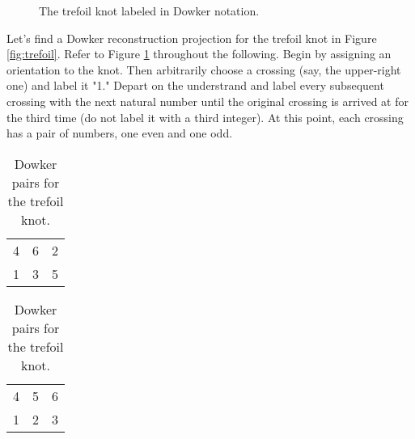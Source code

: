 \documentclass[titlepage]{article}
\begin{document}
\begin{figure}[h!]
    \centering
    \vspace{-2.3em}
    \caption{The trefoil knot labeled in Dowker notation.}
    \label{fig:trefoilDowker}
\end{figure}

Let's find a Dowker reconstruction projection for the trefoil knot in Figure \ref{fig:trefoil}. Refer to Figure \ref{fig:trefoilDowker} throughout the following. Begin by assigning an orientation to the knot. Then arbitrarily choose a crossing (say, the upper-right one) and label it "1." Depart on the understrand and label every subsequent crossing with the next natural number until the original crossing is arrived at for the third time (do not label it with a third integer). At this point, each crossing has a pair of numbers, one even and one odd.\par

\begin{table}[h!]
    \centering
    \begin{subtable}[b]{0.3\linewidth}
        \centering
        \begin{tabular}{ccc}
            4 & 6 & 2\\
            1 & 3 & 5
        \end{tabular}
        \caption{Dowker pairing.}
        \label{tab:trefoilDowkera}
    \end{subtable}
    \begin{subtable}[b]{0.3\linewidth}
        \centering
        \begin{tabular}{ccc}
            4 & 5 & 6\\
            1 & 2 & 3
        \end{tabular}
        \caption{Reconstruction pairing.}
        \label{tab:trefoilDowkerb}
    \end{subtable}
    \caption{Dowker pairs for the trefoil knot.}
    \label{tab:trefoilDowker}
\end{table}
\end{document}
